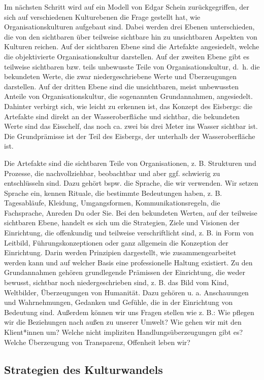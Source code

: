 \documentclass[
  letterpaper,
]{book}
\begin{document}
Im nächsten Schritt wird auf ein Modell von Edgar Schein
zurückgegriffen, der sich auf verschiedenen Kulturebenen die Frage
gestellt hat, wie Organisationskulturen aufgebaut sind. Dabei werden
drei Ebenen unterschieden, die von den sichtbaren über teilweise
sichtbare hin zu unsichtbaren Aspekten von Kulturen reichen. Auf der
sichtbaren Ebene sind die Artefakte angesiedelt, welche die
objektivierte Organisationskultur darstellen. Auf der zweiten Ebene gibt
es teilweise sichtbaren bzw. teils unbewusste Teile von
Organisationskultur, d.~h. die bekundeten Werte, die zwar
niedergeschriebene Werte und Überzeugungen darstellen. Auf der dritten
Ebene sind die unsichtbaren, meist unbewussten Anteile von
Organisationskultur, die sogenannten Grundannahmen, angesiedelt.
Dahinter verbirgt sich, wie leicht zu erkennen ist, das Konzept des
Eisbergs: die Artefakte sind direkt an der Wasseroberfläche und
sichtbar, die bekundeten Werte sind das Eisschelf, das noch ca. zwei bis
drei Meter ins Wasser sichtbar ist. Die Grundprämisse ist der Teil des
Eisbergs, der unterhalb der Wasseroberfläche ist.

Die Artefakte sind die sichtbaren Teile von Organisationen, z. B.
Strukturen und Prozesse, die nachvollziehbar, beobachtbar und aber ggf.
schwierig zu entschlüsseln sind. Dazu gehört bspw. die Sprache, die wir
verwenden. Wir setzen Sprache ein, kennen Rituale, die bestimmte
Bedeutungen haben, z. B. Tagesabläufe, Kleidung, Umgangsformen,
Kommunikationsregeln, die Fachsprache, Anreden Du oder Sie. Bei den
bekundeten Werten, auf der teilweise sichtbaren Ebene, handelt es sich
um die Strategien, Ziele und Visionen der Einrichtung, die offenkundig
und teilweise verschriftlicht sind, z. B. in Form von Leitbild,
Führungskonzeptionen oder ganz allgemein die Konzeption der Einrichtung.
Darin werden Prinzipien dargestellt, wie zusammengearbeitet werden kann
und auf welcher Basis eine professionelle Haltung existiert. Zu den
Grundannahmen gehören grundlegende Prämissen der Einrichtung, die weder
bewusst, sichtbar noch niedergeschrieben sind, z. B. das Bild vom Kind,
Weltbilder, Überzeugungen von Humanität. Dazu gehören u. a. Anschauungen
und Wahrnehmungen, Gedanken und Gefühle, die in der Einrichtung von
Bedeutung sind. Außerdem können wir uns Fragen stellen wie z. B.: Wie
pflegen wir die Beziehungen nach außen zu unserer Umwelt? Wie gehen wir
mit den Klient*innen um? Welche nicht impliziten Handlungsüberzeugungen
gibt es? Welche Überzeugung von Transparenz, Offenheit leben wir?

\subsection{Strategien des
Kulturwandels}\label{strategien-des-kulturwandels}
\end{document}
